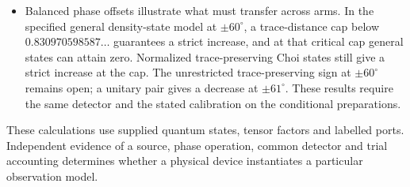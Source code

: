 \documentclass[11pt,letterpaper]{article}
\begin{document}
\begin{itemize}
\item Balanced phase offsets illustrate what must transfer across arms. In the specified general density-state model at $\pm60^\circ$, a trace-distance cap below $0.830970598587\ldots$ guarantees a strict increase, and at that critical cap general states can attain zero. Normalized trace-preserving Choi states still give a strict increase at the cap. The unrestricted trace-preserving sign at $\pm60^\circ$ remains open; a unitary pair gives a decrease at $\pm61^\circ$. These results require the same detector and the stated calibration on the conditional preparations.
\end{itemize}
These calculations use supplied quantum states, tensor factors and labelled ports. Independent evidence of a source, phase operation, common detector and trial accounting determines whether a physical device instantiates a particular observation model.
\end{document}
